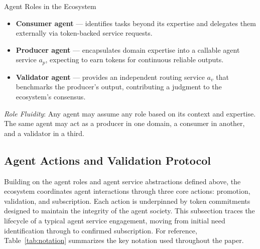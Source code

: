 \begin{insightbox}{Agent Roles in the Ecosystem}
\begin{itemize}[leftmargin=1.5em, itemsep=3pt, topsep=2pt]
    \item \textbf{Consumer agent} --- identifies tasks beyond its expertise and delegates them externally via token-backed service requests.
    \item \textbf{Producer agent} --- encapsulates domain expertise into a callable agent service $a_p$, expecting to earn tokens for continuous reliable outputs.
    \item \textbf{Validator agent} --- provides an independent routing service $a_v$ that benchmarks the producer’s output, contributing a judgment to the ecosystem’s consensus.
\end{itemize}
\vspace{1pt}
\textit{Role Fluidity}: Any agent may assume any role based on its context and expertise. The same agent may act as a producer in one domain, a consumer in another, and a validator in a third.
\end{insightbox}

\subsection{Agent Actions and Validation Protocol}
\label{sec:mechanism}

Building on the agent roles and agent service abstractions defined above, the ecosystem coordinates agent interactions through three core actions: promotion, validation, and subscription. Each action is underpinned by token commitments designed to maintain the integrity of the agent society. This subsection traces the lifecycle of a typical agent service engagement, moving from initial need identification through to confirmed subscription. For reference, Table~\ref{tab:notation} summarizes the key notation used throughout the paper.

